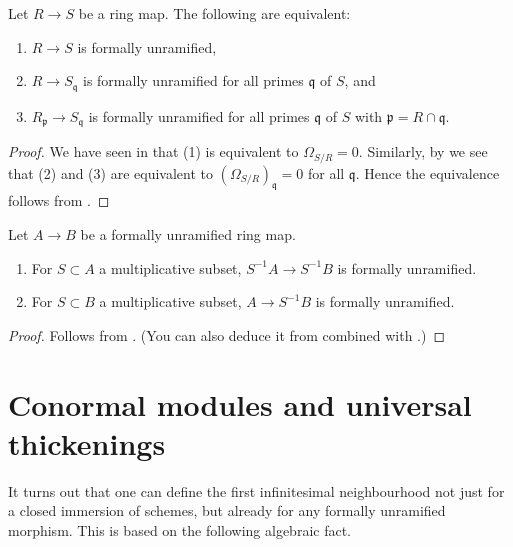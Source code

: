 \begin{lemma}
\label{lemma-formally-unramified-local}
Let $R \to S$ be a ring map.
The following are equivalent:
\begin{enumerate}
\item $R \to S$ is formally unramified,
\item $R \to S_{\mathfrak q}$ is formally unramified for all
primes $\mathfrak q$ of $S$, and
\item $R_{\mathfrak p} \to S_{\mathfrak q}$ is formally unramified
for all primes $\mathfrak q$ of $S$ with $\mathfrak p = R \cap \mathfrak q$.
\end{enumerate}
\end{lemma}

\begin{proof}
We have seen in
that (1) is equivalent to
$\Omega_{S/R} = 0$. Similarly, by
we see that (2) and (3)
are equivalent to $(\Omega_{S/R})_{\mathfrak q} = 0$ for all
$\mathfrak q$. Hence the equivalence follows from
.
\end{proof}

\begin{lemma}
\label{lemma-formally-unramified-localize}
Let $A \to B$ be a formally unramified ring map.
\begin{enumerate}
\item For $S \subset A$ a multiplicative subset,
$S^{-1}A \to S^{-1}B$ is formally unramified.
\item For $S \subset B$ a multiplicative subset,
$A \to S^{-1}B$ is formally unramified.
\end{enumerate}
\end{lemma}

\begin{proof}
Follows from
.
(You can also deduce it from
combined with
.)
\end{proof}



\section{Conormal modules and universal thickenings}
\label{section-conormal}

\noindent
It turns out that one can define the first infinitesimal neighbourhood
not just for a closed immersion of schemes, but already for any formally
unramified morphism. This is based on the following algebraic fact.

